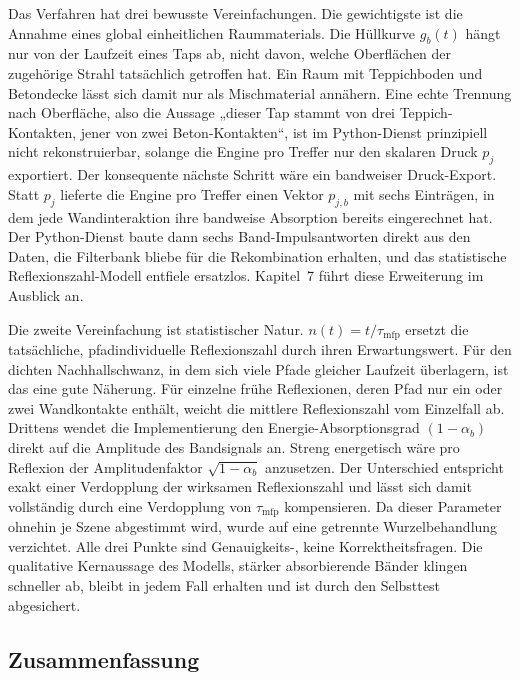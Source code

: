 Das Verfahren hat drei bewusste Vereinfachungen. Die gewichtigste ist die Annahme
eines global einheitlichen Raummaterials. Die Hüllkurve $g_b(t)$ hängt nur von
der Laufzeit eines Taps ab, nicht davon, welche Oberflächen der zugehörige Strahl
tatsächlich getroffen hat. Ein Raum mit Teppichboden und Betondecke lässt sich
damit nur als Mischmaterial annähern. Eine echte Trennung nach Oberfläche, also
die Aussage „dieser Tap stammt von drei Teppich-Kontakten, jener von zwei
Beton-Kontakten“, ist im Python-Dienst prinzipiell nicht rekonstruierbar, solange
die Engine pro Treffer nur den skalaren Druck $p_j$ exportiert. Der konsequente
nächste Schritt wäre ein bandweiser Druck-Export. Statt $p_j$ lieferte die Engine
pro Treffer einen Vektor $p_{j,b}$ mit sechs Einträgen, in dem jede
Wandinteraktion ihre bandweise Absorption bereits eingerechnet hat. Der
Python-Dienst baute dann sechs Band-Impulsantworten direkt aus den Daten, die
Filterbank bliebe für die Rekombination erhalten, und das statistische
Reflexionszahl-Modell entfiele ersatzlos. Kapitel~7 führt diese Erweiterung im
Ausblick an.

Die zweite Vereinfachung ist statistischer Natur. $n(t) = t / \tau_{\mathrm{mfp}}$
ersetzt die tatsächliche, pfadindividuelle Reflexionszahl durch ihren
Erwartungswert. Für den dichten Nachhallschwanz, in dem sich viele Pfade gleicher
Laufzeit überlagern, ist das eine gute Näherung. Für einzelne frühe Reflexionen,
deren Pfad nur ein oder zwei Wandkontakte enthält, weicht die mittlere
Reflexionszahl vom Einzelfall ab. Drittens wendet die Implementierung den
Energie-Absorptionsgrad $(1 - \alpha_b)$ direkt auf die Amplitude des Bandsignals
an. Streng energetisch wäre pro Reflexion der Amplitudenfaktor
$\sqrt{1 - \alpha_b}$ anzusetzen. Der Unterschied entspricht exakt einer
Verdopplung der wirksamen Reflexionszahl und lässt sich damit vollständig durch
eine Verdopplung von $\tau_{\mathrm{mfp}}$ kompensieren. Da dieser Parameter
ohnehin je Szene abgestimmt wird, wurde auf eine getrennte Wurzelbehandlung
verzichtet. Alle drei Punkte sind Genauigkeits-, keine Korrektheitsfragen. Die
qualitative Kernaussage des Modells, stärker absorbierende Bänder klingen
schneller ab, bleibt in jedem Fall erhalten und ist durch den Selbsttest
abgesichert.

\subsection{Zusammenfassung}
\label{subsec:dsp-zusammenfassung}


